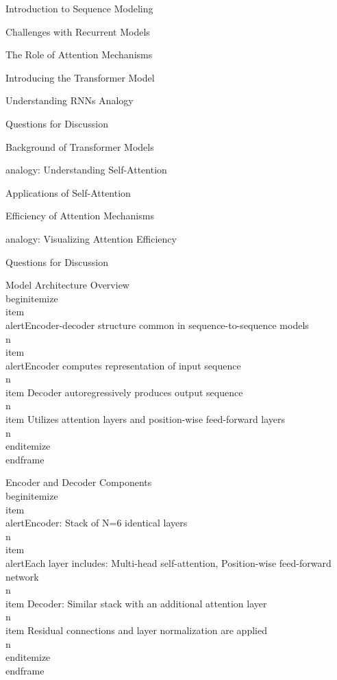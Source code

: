 \documentclass{beamer}
\begin{document}
\begin{frame}[]{Introduction to Sequence Modeling}
\begin{frame}[]{Challenges with Recurrent Models}
\begin{frame}[]{The Role of Attention Mechanisms}
\begin{frame}[]{Introducing the Transformer Model}
\begin{frame}[plain]{Understanding RNNs Analogy}
\begin{frame}[]{Questions for Discussion}
\begin{frame}[]{Background of Transformer Models}
\begin{frame}[plain]{analogy: Understanding Self-Attention}
\begin{frame}[]{Applications of Self-Attention}
\begin{frame}[]{Efficiency of Attention Mechanisms}
\begin{frame}[plain]{analogy: Visualizing Attention Efficiency}
\begin{frame}[]{Questions for Discussion}
\begingroup
{}\n{}\n\begin{frame}[]{Model Architecture Overview}\n\\begin{itemize}
\\item \\alert{Encoder-decoder structure common in sequence-to-sequence models}\\n\\item \\alert{Encoder computes representation of input sequence}\\n\\item Decoder autoregressively produces output sequence\\n\\item Utilizes attention layers and position-wise feed-forward layers\\n\\end{itemize}
\\end{frame}

\endgroup

\begingroup
{}\n{}\n\begin{frame}[]{Encoder and Decoder Components}\n\\begin{itemize}
\\item \\alert{Encoder: Stack of N=6 identical layers}\\n\\item \\alert{Each layer includes: Multi-head self-attention, Position-wise feed-forward network}\\n\\item Decoder: Similar stack with an additional attention layer\\n\\item Residual connections and layer normalization are applied\\n\\end{itemize}
\\end{frame}

\endgroup


\end{frame}
\end{frame}
\end{frame}
\end{frame}
\end{frame}
\end{frame}
\end{frame}
\end{frame}
\end{frame}
\end{frame}
\end{frame}
\end{frame}
\end{frame}
\end{frame}
\end{document}
